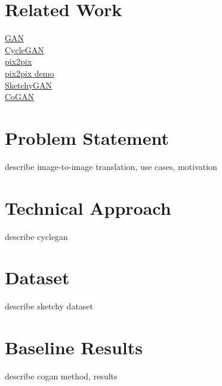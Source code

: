 \documentclass[10pt,twocolumn,letterpaper]{article}
\begin{document}
\section{Related Work}
\href{https://arxiv.org/abs/1406.2661}{GAN} \\
\href{https://arxiv.org/pdf/1703.10593}{CycleGAN} \\
\href{https://arxiv.org/abs/1611.07004}{pix2pix} \\
\href{https://affinelayer.com/pixsrv/}{pix2pix demo} \\
\href{https://arxiv.org/abs/1801.02753}{SketchyGAN} \\
\href{https://arxiv.org/abs/1606.07536}{CoGAN} \\

\section{Problem Statement}
describe image-to-image translation, use cases, motivation

\section{Technical Approach}
describe cyclegan

\section{Dataset}
describe sketchy dataset

\section{Baseline Results}
describe cogan method, results

{\small


}
\end{document}

